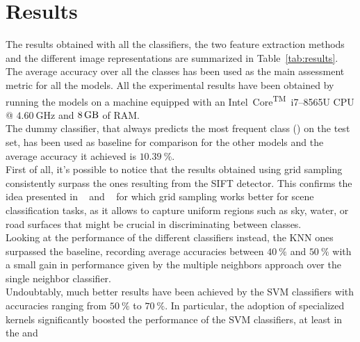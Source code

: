 \documentclass[../main.tex]{subfiles}
\begin{document}
\section{Results}\label{sec:results}

The results obtained with all the classifiers, the two feature extraction methods and the different image representations are summarized in Table~\ref{tab:results}.
The average accuracy over all the classes has been used as the main assessment
metric for all the models. 
All the experimental results have been obtained by running the models on a machine equipped with an Intel\textsuperscript{\textregistered}~Core\textsuperscript{TM}~i7--8565U CPU @ $\SI{4.60}{\giga\hertz}$ and $\SI{8}{\giga\byte}$ of RAM.\\
The dummy classifier, that always predicts the most frequent class  () on the test set, has been used as baseline for comparison
for the other models and the average accuracy it achieved is $\SI{10.39}{\percent}$.\\
First of all, it's possible to notice that the results obtained using grid sampling consistently surpass the ones resulting from the SIFT detector. This confirms the idea presented in ~\cite{feifei} and ~\cite{lazebnik} for which grid sampling works better for scene classification tasks, as it allows to capture uniform regions such as sky, water, or road surfaces that might be crucial in discriminating between classes.\\
Looking at the performance of the different classifiers instead, the KNN ones
surpassed the baseline, recording average accuracies
between $\SI{40}{\percent}$ and $\SI{50}{\percent}$ with a small gain in
performance given by the multiple neighbors approach over the single
neighbor classifier.\\
Undoubtably, much better results have been achieved by the SVM
classifiers with accuracies ranging from $\SI{50}{\percent}$ to
$\SI{70}{\percent}$.
In particular, the adoption of specialized kernels significantly boosted the
performance of the SVM classifiers, at least in the  and 
\end{document}
